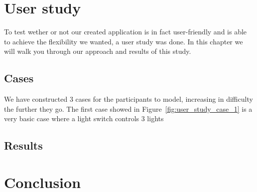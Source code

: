 \documentclass[11pt,a4paper]{report}
\begin{document}
\chapter{User study}
To test wether or not our created application is in fact user-friendly and is able to achieve the flexibility we wanted, a user study was done. In this chapter we will walk you through our approach and results of this study.

\section{Cases}
We have constructed 3 cases for the participants to model, increasing in difficulty the further they go. The first case showed in Figure~\ref{fig:user_study_case_1} is a very basic case where a light switch controls 3 lights

\section{Results}

\chapter{Conclusion}

\printbibliography
\end{document}
